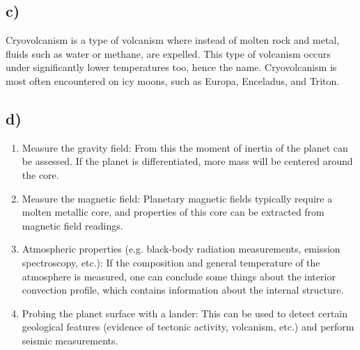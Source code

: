 \subsection*{c)}
Cryovolcanism is a type of volcanism where instead of molten rock and metal, fluids such as water or methane, are expelled. This type of volcanism occurs under significantly lower temperatures too, hence the name. Cryovolcanism is most often encountered on icy moons, such as Europa, Enceladus, and Triton.

\subsection*{d)}
\begin{enumerate}
    \item Measure the gravity field: From this the moment of inertia of the planet can be assessed. If the planet is differentiated, more mass will be centered around the core.
    \item Measure the magnetic field: Planetary magnetic fields typically require a molten metallic core, and properties of this core can be extracted from magnetic field readings.
    \item Atmospheric properties (e.g. black-body radiation measurements, emission spectroscopy, etc.): If the composition and general temperature of the atmosphere is measured, one can conclude some things about the interior convection profile, which contains information about the internal structure.
    \item Probing the planet surface with a lander: This can be used to detect certain geological features (evidence of tectonic activity, volcanism, etc.) and perform seismic measurements.
\end{enumerate}